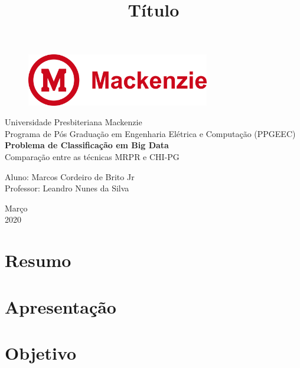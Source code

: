 \documentclass[a4paper, 12pt]{article}
\begin{document}

\begin{titlepage}
	\begin{center}
	
	\begin{figure}[!ht]
	\centering
	\includegraphics[width=8cm]{mackenzie-logo-2.png}
    \end{figure}

		\Huge{Universidade Presbiteriana Mackenzie}\\
		\large{Programa de Pós Graduação em Engenharia Elétrica e Computação (PPGEEC)}\\ 
		\vspace{15pt}
        \vspace{95pt}
        \textbf{\LARGE{Problema de Classificação em Big Data}}\\
        Comparação entre as técnicas MRPR e CHI-PG
		\title{{\large{Título}}}
		\vspace{3,5cm}
	\end{center}
	
	\begin{flushleft}
		\begin{tabbing}
			Aluno: Marcos Cordeiro de Brito Jr\\
			Professor: Leandro Nunes da Silva\\
	\end{tabbing}
 \end{flushleft}
	\vspace{1cm}
	
	\begin{center}
		\vspace{\fill}
			 Março\\
		 2020
			\end{center}
\end{titlepage}

\newpage
\tableofcontents
\thispagestyle{empty}

\newpage
{}
\section{Resumo}
\newpage
\section{Apresentação}
\newpage

\section{Objetivo}
\newpage



\end{document}
